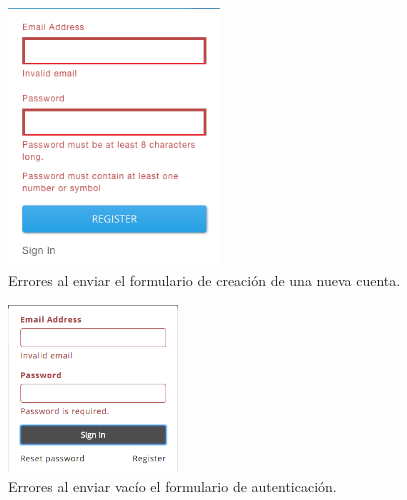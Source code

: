 
\begin{figure}[H]
	\centering
	\includegraphics[width=0.5\textwidth]{figuras/architecture/accounts/new/send_error.png}
	\caption{Errores al enviar el formulario de creación de una nueva cuenta.}
	\label{figure:architecture:accounts:new:send_error}
\end{figure}

\begin{figure}[H]
	\centering
	\includegraphics[width=0.4\textwidth]{figuras/architecture/accounts/signin/send_empty.png}
	\caption{Errores al enviar vacío el formulario de autenticación.}
	\label{figure:architecture:accounts:signin:send_empty}
\end{figure}